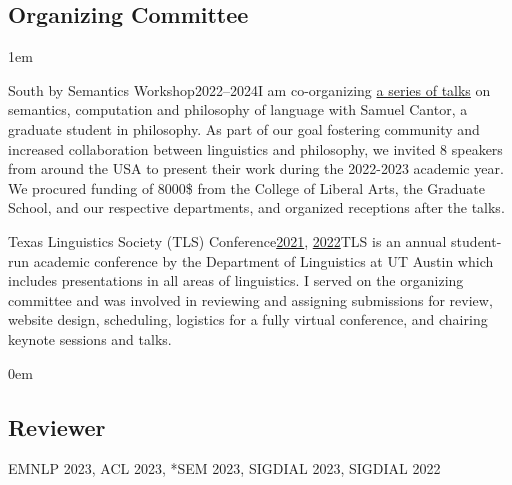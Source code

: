 \subsection{Organizing Committee}

\leftskip1em\relax

\smallentry
  {\large South by Semantics Workshop}{2022--2024}{I am co-organizing \href{https://sites.utexas.edu/sxsemantics/}{a series of talks} on semantics, computation and philosophy of language with Samuel Cantor, a graduate student in philosophy. As part of our goal fostering community and increased collaboration between linguistics and philosophy, we invited 8 speakers from around the USA to present their work during the 2022-2023 academic year. We procured funding of 8000\$ from the College of Liberal Arts, the Graduate School, and our respective departments, and organized receptions after the talks.}
  
\smallentry
    {\large Texas Linguistics Society (TLS) Conference}{\href{http://tls.ling.utexas.edu/2021/}{2021}, \href{http://tls.ling.utexas.edu/2022/}{2022}}{TLS is an annual student-run academic conference by the Department of Linguistics at UT Austin which includes presentations in all areas of linguistics. I served on the organizing committee and was involved in reviewing and assigning submissions for review, website design, scheduling, logistics for a fully virtual conference, and chairing keynote sessions and talks.}

\leftskip0em\relax

\subsection{Reviewer}

\quad EMNLP 2023, ACL 2023, *SEM 2023, SIGDIAL 2023, SIGDIAL 2022
